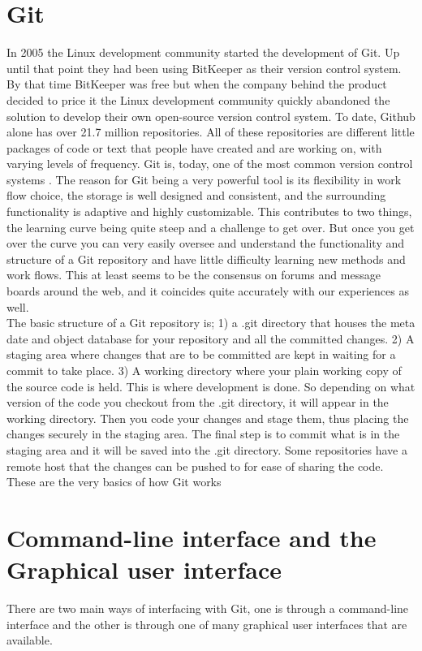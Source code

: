 \documentclass[a4paper,oneside]{bth} %
\begin{document}
			\section{Git}
			In 2005 the Linux development community started the development of Git.
			Up until that point they had been using BitKeeper as their version control system. By that time BitKeeper was free but when the company behind the product decided to price it the Linux development community quickly abandoned the solution to develop their own open-source version control system.\cite{ProGit}
			To date, Github alone has over 21.7 million repositories.\cite{GithubAbout} All of these repositories are different little packages of code or text that people have created and are working on, with varying levels of frequency.
			Git is, today, one of the most common version control systems \cite{EclipseDeveoperReport}\cite{DeveloperProductivity}\cite{MicrosoftSurveyResults}. The reason for Git being a very powerful tool is its flexibility in work flow choice, the storage is well designed and consistent,\cite{WhyGit} and the surrounding functionality is adaptive and highly customizable. This contributes to two things, the learning curve being quite steep and a challenge to get over. But once you get over the curve you can very easily oversee and understand the functionality and structure of a Git repository and have little difficulty learning new methods and work flows. This at least seems to be the consensus on forums and message boards around the web, and it coincides quite accurately with our experiences as well.
			\\
			The basic structure of a Git repository is; 1) a .git directory that houses the meta date and object database for your repository and all the committed changes. 2) A staging area where changes that are to be committed are kept in waiting for a commit to take place. 3) A working directory where your plain working copy of the source code is held. This is where development is done. \cite{GitStructure} 
			So depending on what version of the code you checkout from the .git directory, it will appear in the working directory. Then you code your changes and stage them, thus placing the changes securely in the staging area. The final step is to commit what is in the staging area and it will be saved into the .git directory. Some repositories have a remote host that the changes can be pushed to for ease of sharing the code. These are the very basics of how Git works \cite{GitStructure}
			
			\section{Command-line interface and the Graphical user interface}
			There are two main ways of interfacing with Git, one is through a command-line interface and the other is through one of many graphical user interfaces that are available. \cite{GitGUIs}\\
			
\end{document}
